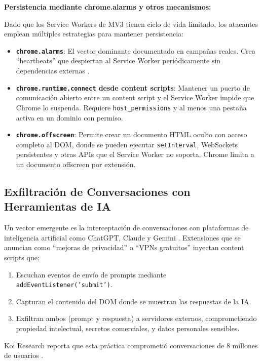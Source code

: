 \documentclass[12pt,oneside]{report}
\begin{document}
\textbf{Persistencia mediante chrome.alarms y otros mecanismos:}

Dado que los Service Workers de MV3 tienen ciclo de vida limitado, los atacantes emplean múltiples estrategias para mantener persistencia:
\begin{itemize}
    \item \textbf{\texttt{chrome.alarms}}: El vector dominante documentado en campañas reales. Crea ``heartbeats'' que despiertan al Service Worker periódicamente sin dependencias externas \cite{seetharam2025genai, stealth_extension}.
    \item \textbf{\texttt{chrome.runtime.connect} desde content scripts}: Mantener un puerto de comunicación abierto entre un content script y el Service Worker impide que Chrome lo suspenda. Requiere \texttt{host\_permissions} y al menos una pestaña activa en un dominio con permiso.
    \item \textbf{\texttt{chrome.offscreen}}: Permite crear un documento HTML oculto con acceso completo al DOM, donde se pueden ejecutar \texttt{setInterval}, WebSockets persistentes y otras APIs que el Service Worker no soporta. Chrome limita a un documento offscreen por extensión.
\end{itemize}

\subsection{Exfiltración de Conversaciones con Herramientas de IA}

Un vector emergente es la interceptación de conversaciones con plataformas de inteligencia artificial como ChatGPT, Claude y Gemini \cite{dardikman2025aiconversations}. Extensiones que se anuncian como ``mejoras de privacidad'' o ``VPNs gratuitos'' inyectan content scripts que:

\begin{enumerate}
    \item Escuchan eventos de envío de prompts mediante \texttt{addEventListener('submit')}.
    \item Capturan el contenido del DOM donde se muestran las respuestas de la IA.
    \item Exfiltran ambos (prompt y respuesta) a servidores externos, comprometiendo propiedad intelectual, secretos comerciales, y datos personales sensibles.
\end{enumerate}

Koi Research reporta que esta práctica comprometió conversaciones de 8 millones de usuarios \cite{dardikman2025aiconversations}.
\end{document}
